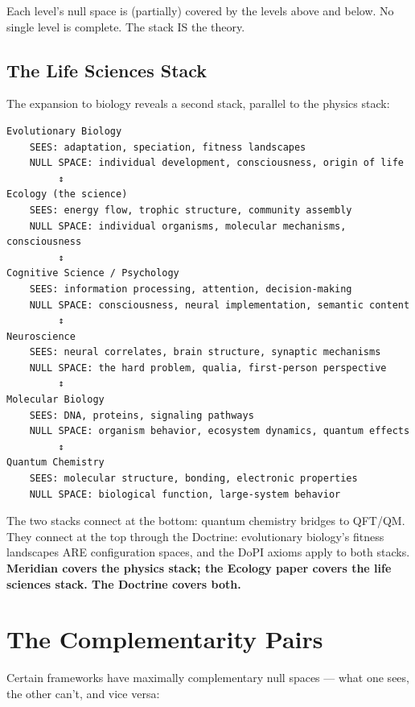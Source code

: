Each level's null space is (partially) covered by the levels above and below. No single level is complete. The stack IS the theory.


\subsection*{The Life Sciences Stack}


The expansion to biology reveals a second stack, parallel to the physics stack:


\begin{verbatim}
Evolutionary Biology
    SEES: adaptation, speciation, fitness landscapes
    NULL SPACE: individual development, consciousness, origin of life
         ↕
Ecology (the science)
    SEES: energy flow, trophic structure, community assembly
    NULL SPACE: individual organisms, molecular mechanisms, consciousness
         ↕
Cognitive Science / Psychology
    SEES: information processing, attention, decision-making
    NULL SPACE: consciousness, neural implementation, semantic content
         ↕
Neuroscience
    SEES: neural correlates, brain structure, synaptic mechanisms
    NULL SPACE: the hard problem, qualia, first-person perspective
         ↕
Molecular Biology
    SEES: DNA, proteins, signaling pathways
    NULL SPACE: organism behavior, ecosystem dynamics, quantum effects
         ↕
Quantum Chemistry
    SEES: molecular structure, bonding, electronic properties
    NULL SPACE: biological function, large-system behavior
\end{verbatim}


The two stacks connect at the bottom: quantum chemistry bridges to QFT/QM. They connect at the top through the Doctrine: evolutionary biology's fitness landscapes ARE configuration spaces, and the DoPI axioms apply to both stacks. \textbf{Meridian covers the physics stack; the Ecology paper covers the life sciences stack. The Doctrine covers both.}


\section*{The Complementarity Pairs}


Certain frameworks have maximally complementary null spaces — what one sees, the other can't, and vice versa:



